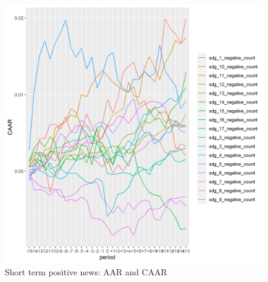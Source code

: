 \begin{figure}
    \centering
    \includegraphics[scale=0.6]{Projekt/1.Figures analysis/ST_negative_sdgs.png}
    \caption{Short term positive news: AAR and CAAR}
    \label{fig:ST_pos_news}
\end{figure}
